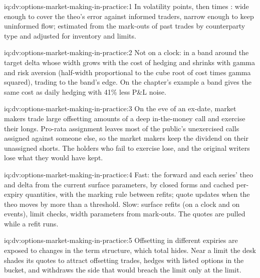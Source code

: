 \begin{solution}{iq:dv:options-market-making-in-practice:1}
In volatility points, then times : wide enough to cover the theo's error against informed traders, narrow enough to keep uninformed flow; estimated from the
mark-outs of past trades by counterparty type and adjusted for inventory and limits.
\end{solution}

\begin{solution}{iq:dv:options-market-making-in-practice:2}
Not on a clock: in a band around the target delta whose width grows with the cost of hedging and shrinks with gamma and risk aversion (half-width proportional
to the cube root of cost times gamma squared), trading to the band's edge. On the chapter's example a band gives the same cost as daily hedging with 41\% less
P\&L noise.
\end{solution}

\begin{solution}{iq:dv:options-market-making-in-practice:3}
On the eve of an ex-date, market makers trade large offsetting amounts of a deep in-the-money call and exercise their longs. Pro-rata assignment leaves most of the
public's unexercised calls assigned against someone else, so the market makers keep the dividend on their unassigned shorts. The holders who fail to exercise
lose, and the original writers lose what they would have kept.
\end{solution}

\begin{solution}{iq:dv:options-market-making-in-practice:4}
Fast: the forward and each series' theo and delta from the current surface parameters, by closed forms and cached per-expiry quantities, with the marking rule
between refits; quote updates when the theo moves by more than a threshold. Slow: surface refits (on a clock and on events), limit checks, width parameters from
mark-outs. The quotes are pulled while a refit runs.
\end{solution}

\begin{solution}{iq:dv:options-market-making-in-practice:5}
Offsetting  in different expiries are exposed to changes in the term structure, which total  hides. Near a limit the desk shades its quotes to attract
offsetting trades, hedges with listed options in the bucket, and withdraws the side that would breach the limit only at the limit.
\end{solution}

